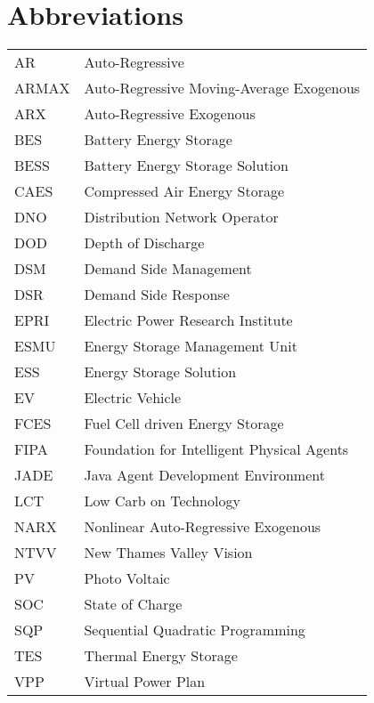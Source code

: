 \chapter*{Abbreviations}


\begin{table*}[hbt]
  \begin{tabular}{l l}
    AR & Auto-Regressive\\
    ARMAX & Auto-Regressive Moving-Average Exogenous\\
    ARX & Auto-Regressive Exogenous\\
    BES & Battery Energy Storage\\
    BESS & Battery Energy Storage Solution\\
    CAES & Compressed Air Energy Storage\\
    DNO & Distribution Network Operator\\
    DOD & Depth of Discharge\\
    DSM & Demand Side Management\\
    DSR & Demand Side Response\\
    EPRI & Electric Power Research Institute\\
    ESMU & Energy Storage Management Unit\\
    ESS & Energy Storage Solution\\
    EV & Electric Vehicle\\
    FCES & Fuel Cell driven Energy Storage\\
    FIPA & Foundation for Intelligent Physical Agents\\
    JADE & Java Agent Development Environment\\
    LCT & Low Carb on Technology\\
    NARX & Nonlinear Auto-Regressive Exogenous\\
    NTVV & New Thames Valley Vision\\
    PV & Photo Voltaic\\
    SOC & State of Charge\\
    SQP & Sequential Quadratic Programming\\
    TES & Thermal Energy Storage\\
    VPP & Virtual Power Plan
  \end{tabular}
\end{table*}
